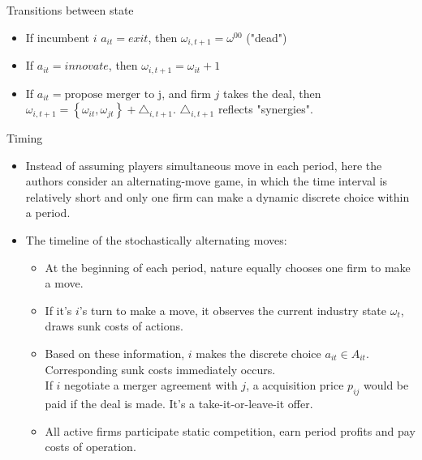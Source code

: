 \documentclass[aspectratio=169]{beamer}  %
\begin{document}
\begin{frame}{Transitions between state}
    \begin{itemize}
    \item If incumbent $i$ $a_{it}=exit$, then $\omega_{i,t+1}=\omega^{00}$ ("dead")\\
    \item If $a_{it}=innovate$, then $\omega_{i,t+1}=\omega_{it}+1$ \\
    \item If $a_{it}=\text{propose  merger  to j}$, and firm $j$ takes the deal, then $\omega_{i,t+1}=\left\{\omega_{it}, \omega_{jt}\right\}+\triangle_{i, t+1}$. $\triangle_{i, t+1}$ reflects "synergies".
    
    \end{itemize}
\end{frame}

\begin{frame}{Timing}
    \begin{itemize}
    \item Instead of assuming players simultaneous move in each period, here the authors consider an alternating-move game, in which the time interval is relatively short and only one firm can make a dynamic discrete choice within a period. 
    \item The timeline of the stochastically alternating moves:
        \begin{itemize}
            \item At the beginning of each period, nature equally chooses one firm to make a move.
            \item If it's $i$'s turn to make a move, it observes the current industry state $\omega_t$, draws sunk costs of actions.
            \item Based on these information, $i$ makes the discrete choice $a_{it} \in A_{it}$. Corresponding sunk costs immediately occurs. \\
            If $i$ negotiate a merger agreement with $j$, a acquisition price $p_{ij}$ would be paid if the deal is made. It's a take-it-or-leave-it offer.
            \item All active firms participate static competition, earn period profits and pay costs of operation.
        \end{itemize}
    \end{itemize}
\end{frame}
\end{document}
